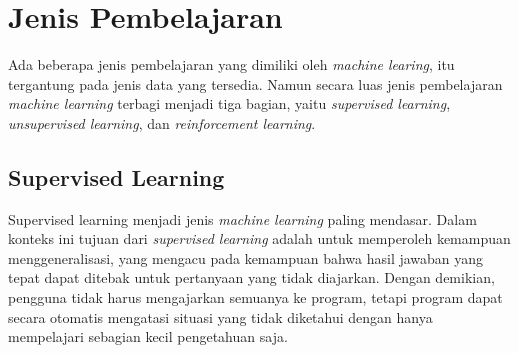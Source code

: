 \section{Jenis Pembelajaran}
Ada beberapa jenis pembelajaran yang dimiliki oleh \emph{machine learing}, itu tergantung pada jenis data yang tersedia. Namun secara luas jenis pembelajaran
\emph{machine learning} terbagi menjadi tiga bagian, yaitu \emph{supervised learning}, \emph{unsupervised learning}, dan \emph{reinforcement learning}.
\subsection{Supervised Learning}
Supervised learning menjadi jenis \emph{machine learning} paling mendasar. Dalam konteks ini tujuan dari \emph{supervised learning} adalah
untuk memperoleh kemampuan menggeneralisasi, yang mengacu pada kemampuan bahwa hasil jawaban yang tepat dapat ditebak untuk pertanyaan yang tidak diajarkan.
Dengan demikian, pengguna tidak harus mengajarkan semuanya ke program, tetapi program dapat secara otomatis mengatasi situasi yang tidak diketahui dengan hanya mempelajari
sebagian kecil pengetahuan saja.

